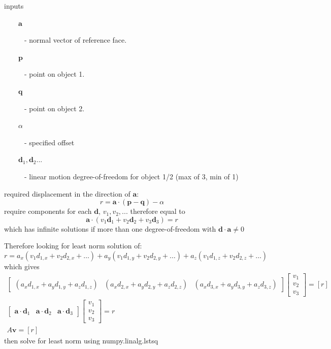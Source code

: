\documentclass[a4paper,10pt]{article}
\begin{document}
inputs
\begin{description}
 \item[~~~~$\mathbf{a}$] - normal vector of reference face.
 \item[~~~~$\mathbf{p}$] - point on object 1.
 \item[~~~~$\mathbf{q}$] - point on object 2. 
 \item[~~~~$\alpha$] - specified offset
 \item[~~~~$\mathbf{d}_1,\mathbf{d}_2...$] - linear motion degree-of-freedom for object 1/2 (max of 3, min of 1)
\end{description}
required displacement in the direction of  $\mathbf{a}$:
\begin{equation}
 r = \mathbf{a} \cdot (\mathbf{p} - \mathbf{q}) - \alpha
\end{equation}
require components for each $\mathbf{d}$, $v_1,v_2,...$ therefore equal to
\begin{equation}
 \mathbf{a} \cdot ( v_1 \mathbf{d}_1 +  v_2 \mathbf{d}_2 +  v_3 \mathbf{d}_3 )  = r
\end{equation}
which has infinite solutions if more than one degree-of-freedom with $\mathbf{d} \cdot \mathbf{a} \ne 0 $

Therefore looking for least norm solution of:
\begin{equation}
 r = a_x ( v_1 d_{1,x} + v_2 d_{2,x } + \dots) + a_y ( v_1 d_{1,y} + v_2 d_{2,y } + \dots) + a_z ( v_1 d_{1,z} + v_2 d_{2,z } + \dots)
\end{equation}
which gives
\begin{align}
 \begin{bmatrix}
  (a_x d_{1,x} + a_y d_{1,y} + a_z d_{1,z}) &
  (a_x d_{2,x} + a_y d_{2,y} + a_z d_{2,z}) &
  (a_x d_{3,x} + a_y d_{3,y} + a_z d_{3,z})  
 \end{bmatrix}
 \begin{bmatrix}
  v_1  \\ v_2 \\ v_3 
 \end{bmatrix} 
 = [ r ] \\
 \begin{bmatrix}
  \mathbf{a} \cdot \mathbf{d}_1 & \mathbf{a} \cdot \mathbf{d}_2 & \mathbf{a} \cdot \mathbf{d}_3 
 \end{bmatrix}
 \begin{bmatrix}
  v_1  \\ v_2 \\ v_3 
  \end{bmatrix}  = r \\ 
 A \mathbf{v} = [r]
\end{align}
then solve for least norm using numpy.linalg.lstsq
\end{document}
